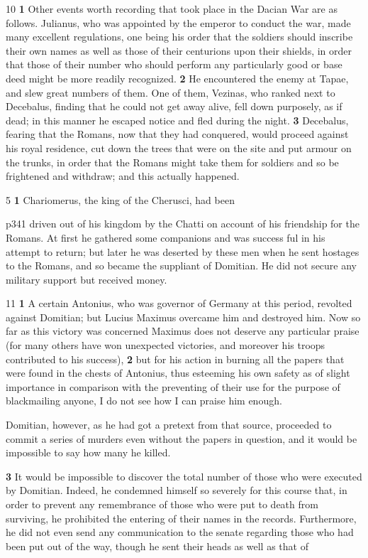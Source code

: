 10
\textbf{1} Other events worth recording that took place in the Dacian War are as follows. Julianus, who was appointed by the emperor to conduct the war, made many excellent regulations, one being his order that the soldiers should inscribe their own names as well as those of their centurions upon their shields, in order that those of their number who should perform any particularly good or base deed might be more readily recognized. \textbf{2} He encountered the enemy at Tapae, and slew great numbers of them. One of them, Vezinas, who ranked next to Decebalus, finding that he could not get away alive, fell down purposely, as if dead; in this manner he escaped notice and fled during the night. \textbf{3} Decebalus, fearing that the Romans, now that they had conquered, would proceed against his royal residence, cut down the trees that were on the site and put armour on the trunks, in order that the Romans might take them for soldiers and so be frightened and withdraw; and this actually happened.

5 \textbf{1} Chariomerus, the king of the Cherusci, had been

p341 driven out of his kingdom by the Chatti on account of his friendship for the Romans. At first he gathered some companions and was success ­ful in his attempt to return; but later he was deserted by these men when he sent hostages to the Romans, and so became the suppliant of Domitian. He did not secure any military support but received money.

11
\textbf{1} A certain Antonius, who was governor of Germany at this period, revolted against Domitian; but Lucius Maximus overcame him and destroyed him. Now so far as this victory was concerned Maximus does not deserve any particular praise (for many others have won unexpected victories, and moreover his troops contributed to his success), \textbf{2} but for his action in burning all the papers that were found in the chests of Antonius, thus esteeming his own safety as of slight importance in comparison with the preventing of their use for the purpose of blackmailing anyone, I do not see how I can praise him enough.

Domitian, however, as he had got a pretext from that source, proceeded to commit a series of murders even without the papers in question, and it would be impossible to say how many he killed.

\textbf{3} It would be impossible to discover the total number of those who were executed by Domitian. Indeed, he condemned himself so severely for this course that, in order to prevent any remembrance of those who were put to death from surviving, he prohibited the entering of their names in the records. Furthermore, he did not even send any communication to the senate regarding those who had been put out of the way, though he sent their heads as well as that of

